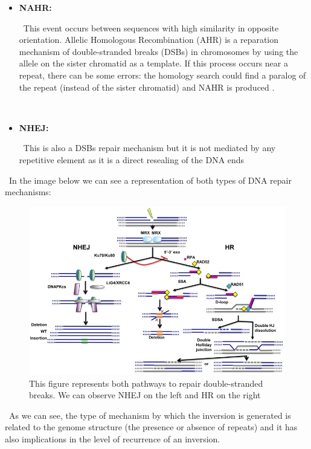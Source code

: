 \documentclass{article}
\begin{document}
\begin{itemize}
    \item {\bf NAHR:} 
    
    \
    This event occurs between sequences with high similarity in opposite orientation. Allelic Homologous Recombination (AHR) is a reparation mechanism of  double-stranded breaks (DSBs) in chromosomes by using the allele on the sister chromatid as a template. If this process occurs near a repeat, there can be some errors: the homology search could find a paralog of the repeat (instead of the sister chromatid) and NAHR is produced \cite{parks_detecting_2015}.
    
    \
    \item{\bf NHEJ:}
    
    \
    This is also a DSBs repair mechanism but it is not mediated by any repetitive element as it is a direct resealing of the DNA ends \cite{decottignies_alternative_2013}
\end{itemize}

\
In the image below we can see a representation of both types of DNA repair mechanisms:
\begin{figure}[!htb]
    \centering
    \includegraphics[width=1\linewidth]{figures/mechanisms.jpg}
    \caption{This figure \cite{decottignies_alternative_2013} represents both pathways to repair double-stranded breaks. We can observe NHEJ on the left and HR on the right}
    \label{fig:pathways}
\end{figure}

\
As we can see, the type of mechanism by which the inversion is generated is related to the genome structure (the presence or absence of repeats) and it has also implications in the level of recurrence of an inversion. 
\end{document}
